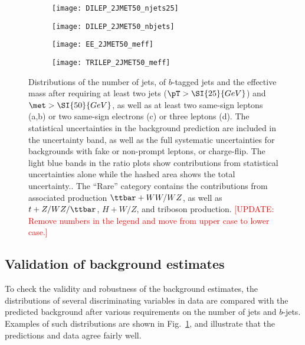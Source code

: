 \begin{figure}[th!]
\centering
\begin{subfigure}[t]{0.49\textwidth}\texttt{[image: DILEP\_2JMET50\_njets25]}\caption{}\end{subfigure}
\begin{subfigure}[t]{0.49\textwidth}\texttt{[image: DILEP\_2JMET50\_nbjets]}\caption{}\end{subfigure}
\begin{subfigure}[t]{0.49\textwidth}\texttt{[image: EE\_2JMET50\_meff]}\caption{}\end{subfigure}
\begin{subfigure}[t]{0.49\textwidth}\texttt{[image: TRILEP\_2JMET50\_meff]}\caption{}\end{subfigure}
\caption{
Distributions of the number of jets, of $b$-tagged jets and the effective mass after requiring at least two jets ($\pT>\SI{25}{GeV}$) and $\met>\SI{50}{GeV}$, 
as well as at least two same-sign leptons (a,b) or two same-sign electrons (c) or three leptons (d). 
The statistical uncertainties in the background prediction are included in the uncertainty band, 
as well as the full systematic uncertainties for backgrounds with fake or non-prompt leptons, or charge-flip. 
The light blue bands in the ratio plots show contributions from statistical uncertainties alone while the hashed area shows the total uncertainty.. 
The ``Rare'' category contains the contributions from associated production $\ttbar+WW/WZ$, 
as well as $t+Z/WZ/\ttbar$, $H+W/Z$, and triboson production. \textcolor{red}{[UPDATE: Remove numbers in the legend 
and move from upper case to lower case.]}
}
\label{fig:Bkg_distribs} 
\end{figure} 


\subsection{Validation of background estimates}
\label{sec:valid}

To check the validity and robustness of the background estimates, 
the distributions of several discriminating variables in data are compared 
with the predicted background after various requirements on the number of jets and $b$-jets. 
Examples of such distributions are shown in Fig.~\ref{fig:Bkg_distribs}, 
and illustrate that the predictions and data agree fairly well. 

